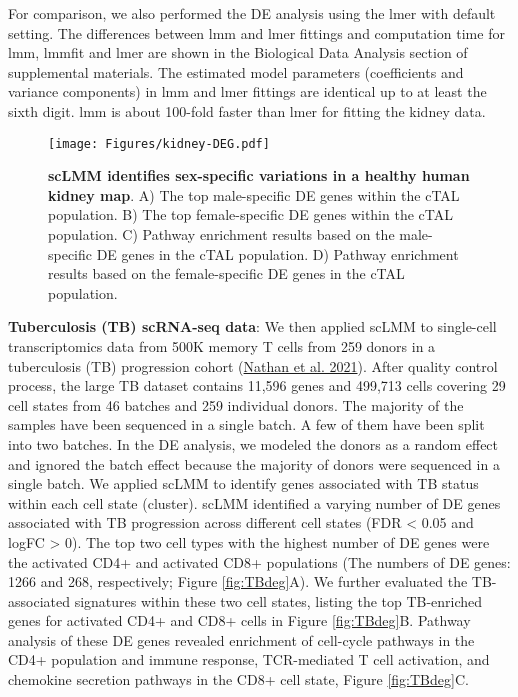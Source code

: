 \documentclass[
]{article}
\begin{document}
For comparison, we also performed the DE analysis using the lmer with
default setting. The differences between lmm and lmer fittings and
computation time for lmm, lmmfit and lmer are shown in the Biological
Data Analysis section of supplemental materials. The estimated model
parameters (coefficients and variance components) in lmm and lmer
fittings are identical up to at least the sixth digit. lmm is about
100-fold faster than lmer for fitting the kidney data.

\begin{figure}
\centering
\texttt{[image: Figures/kidney-DEG.pdf]}
\caption{\textbf{scLMM identifies sex-specific variations in a healthy
human kidney map}. A) The top male-specific DE genes within the cTAL
population. B) The top female-specific DE genes within the cTAL
population. C) Pathway enrichment results based on the male-specific DE
genes in the cTAL population. D) Pathway enrichment results based on the
female-specific DE genes in the cTAL population.\label{fig:kidneydeg}}
\end{figure}

\textbf{Tuberculosis (TB) scRNA-seq data}: We then applied scLMM to
single-cell transcriptomics data from 500K memory T cells from 259
donors in a tuberculosis (TB) progression cohort
(\protect\hyperlink{ref-Nathan2021}{Nathan et al. 2021}). After quality
control process, the large TB dataset contains 11,596 genes and 499,713
cells covering 29 cell states from 46 batches and 259 individual donors.
The majority of the samples have been sequenced in a single batch. A few
of them have been split into two batches. In the DE analysis, we modeled
the donors as a random effect and ignored the batch effect because the
majority of donors were sequenced in a single batch. We applied scLMM to
identify genes associated with TB status within each cell state
(cluster). scLMM identified a varying number of DE genes associated with
TB progression across different cell states (FDR \textless{} 0.05 and
logFC \textgreater{} 0). The top two cell types with the highest number
of DE genes were the activated CD4+ and activated CD8+ populations (The
numbers of DE genes: 1266 and 268, respectively; Figure
\ref{fig:TBdeg}A). We further evaluated the TB-associated signatures
within these two cell states, listing the top TB-enriched genes for
activated CD4+ and CD8+ cells in Figure \ref{fig:TBdeg}B. Pathway
analysis of these DE genes revealed enrichment of cell-cycle pathways in
the CD4+ population and immune response, TCR-mediated T cell activation,
and chemokine secretion pathways in the CD8+ cell state, Figure
\ref{fig:TBdeg}C.
\end{document}
